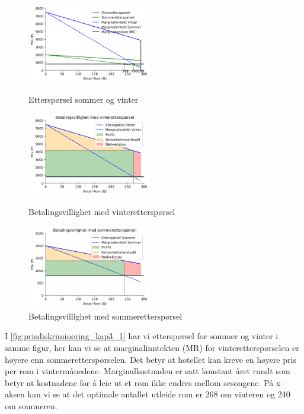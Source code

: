 \documentclass[
  12pt,
  a4paper,
  DIV=11,
  numbers=noendperiod]{scrartcl}
\begin{document}
\begin{figure}
\includegraphics[width=0.48\textwidth]{dokumentobjekter/figurer/prisdiskriminering_kap3_1.png}
  \caption{Etterspørsel sommer og vinter}
  \label{fig:prisdiskriminering_kap3_1}
  \includegraphics[width=0.48\textwidth]{dokumentobjekter/figurer/prisdiskriminering_kap3_2.png}
  \caption{Betalingsvillighet med vinteretterspørsel}
  \label{fig:vinter_ep}
  \includegraphics[width=0.48\textwidth]{dokumentobjekter/figurer/prisdiskriminering_kap3_3.png}
  \caption{Betalingsvillighet med sommeretterspørsel}
  \label{fig:sommer_ep}
  \vspace{-12mm}
\end{figure}

I \autoref{fig:prisdiskriminering_kap3_1} har vi etterspørsel for sommer
og vinter i samme figur, her kan vi se at marginalinntekten (MR) for
vinteretterspørselen er høyere enn sommeretterspørselen. Det betyr at
hotellet kan kreve en høyere pris per rom i vintermånedene.
Marginalkostnaden er satt konstant året rundt som betyr at kostnadene
for å leie ut et rom ikke endres mellom sesongene. På x--aksen kan vi se
at det optimale antallet utleide rom er 268 om vinteren og 240 om
sommeren.
\end{document}
